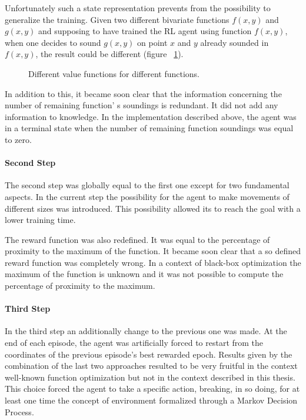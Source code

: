 Unfortunately such a state representation prevents from the possibility to generalize the training. Given two different bivariate functions $f(x, y)$ and $g(x, y)$ and supposing to have trained the RL agent using function $f(x, y)$, when one decides to sound $g(x, y)$ on point $x$ and $y$ already sounded in $f(x, y)$, the result could be different (figure ~\ref{fig:ComparisonBetweenTwoFunctions}).

\begin{figure}[h!]
	\begin{center}
		\subfigure[$f(x, y) = 2xy$, \quad $f(1, 1) = 2$]{%
			\label{fig:2xy}
			\texttt{[image: 2xy]}
		}
	\end{center}
	\caption{
		Different value functions for different functions.
	}
	\label{fig:ComparisonBetweenTwoFunctions}
\end{figure}

In addition to this, it became soon clear that the information concerning the number of remaining function' s soundings is redundant. It did not add any information to knowledge. In the implementation described above, the agent was in a terminal state when the number of remaining function soundings was equal to zero.

\paragraph{Second Step} The second step was globally equal to the first one except for two fundamental aspects. In the current step the possibility for the agent to make movements of different sizes was introduced. This possibility allowed its to reach the goal with a lower training time. 

The reward function was also redefined. It was equal to the percentage of proximity to the maximum of the function. It became soon clear that a so defined reward function was completely wrong. In a context of black-box optimization the maximum of the function is unknown and it was not possible to compute the percentage of proximity to the maximum.

\paragraph{Third Step} In the third step an additionally change to the previous one was made. At the end of each episode, the agent was artificially forced to restart from the coordinates of the previous episode's best rewarded epoch. Results given by the combination of the last two approaches resulted to be very fruitful in the context well-known function optimization but not in the context described in this thesis. This choice forced the agent to take a specific action, breaking, in so doing, for at least one time the concept of environment formalized through a Markov Decision Process.

